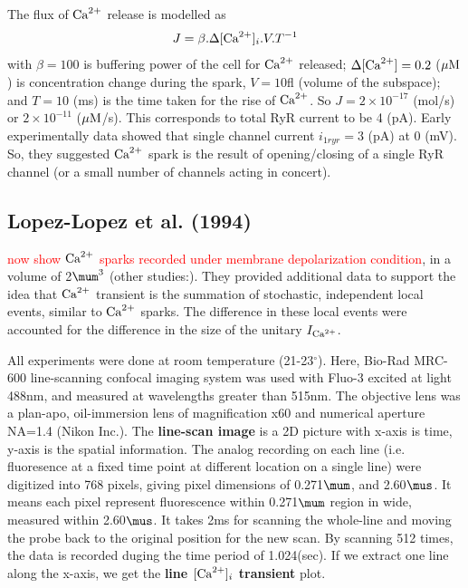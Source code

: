 The flux of ${\text{Ca}^{2+}}$ release is modelled as
\begin{equation}
J = \beta.\Delta[{\text{Ca}^{2+}}]_i . V. T^{-1}
\end{equation}
with $\beta = 100$ is buffering power of the cell for ${\text{Ca}^{2+}}$ released; 
$\Delta[{\text{Ca}^{2+}}]=0.2 $ (${\mu\text{M}}$) is concentration  change during the spark, $V=10$fl
(volume of the subspace); and $T=10$ (ms) is the time taken for the rise of
${\text{Ca}^{2+}}$. So $J=2\times 10^{-17}$ (mol/s) or $2\times 10^{-11}$ (${\mu\text{M}}$/s). This
corresponds to total RyR current  to be 4 (pA). Early experimentally
data showed that single channel current $i_{1ryr}=3$ (pA) at 0 (mV). So, they
suggested ${\text{Ca}^{2+}}$ spark is the result of opening/closing of a single RyR channel
(or a small number of channels acting in concert).

\subsection{Lopez-Lopez et al. (1994)}
\label{sec:lopez-1994}

\textcolor{red}{\citep{lopez-lopez1994} now show ${\text{Ca}^{2+}}$ sparks recorded under
membrane depolarization condition}, in a volume of 2$\mum^3$ (other
studies:\citep{cannell1995b}).
They provided additional data to support the idea that ${\text{Ca}^{2+}}$ transient is the
summation of stochastic, independent local events, similar to ${\text{Ca}^{2+}}$ sparks. The
difference in these local events were accounted for the difference in the size
of the unitary $I_{\text{Ca}^{2+}}$.

All experiments were done at room temperature (21-23$^\circ$). Here, Bio-Rad
MRC-600 line-scanning confocal imaging system was used with Fluo-3 excited at
light 488nm, and measured at wavelengths greater than 515nm. The objective lens
was a plan-apo, oil-immersion lens of magnification x60 and numerical aperture
NA=1.4 (Nikon Inc.). The {\bf line-scan image} is a 2D picture with x-axis is
time, y-axis is the spatial information. The analog recording on each line (i.e.
fluoresence at a fixed time point at different location on a single line) were
digitized into 768 pixels, giving pixel dimensions of 0.271$\mum$, and
2.60$\mus$. It means each pixel represent fluorescence within 0.271$\mum$ region
in wide, measured within 2.60$\mus$. It takes 2ms for scanning the whole-line
and moving the probe back to the original position for the new scan. By scanning
512 times, the data is recorded duging the time period of 1.024(sec). If we
extract one line along the x-axis, we get the {\bf line $[{\text{Ca}^{2+}}]_i$ transient }
plot.
 
